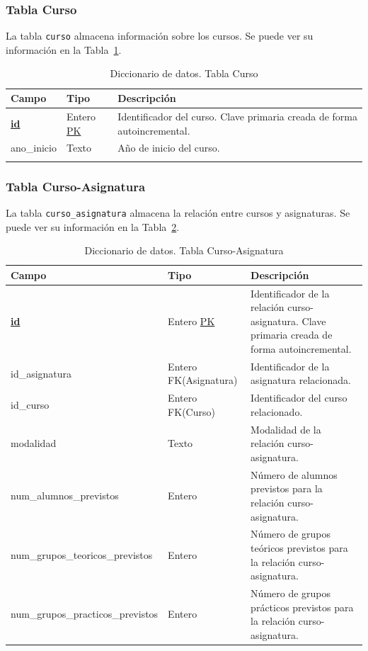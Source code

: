 \subsubsection{Tabla Curso}
La tabla \texttt{curso} almacena información sobre los cursos. Se puede ver su información en la Tabla~\ref{tab:diccionario_curso}.

\begin{table}
  \centering 
  \begin{tabular}{l p{} p{}}
    \toprule
    \textbf{Campo} & \textbf{Tipo} & \textbf{Descripción}\\
    \midrule
    \textbf{\underline{id}} & Entero \underline{PK} & Identificador del curso. Clave primaria creada de forma autoincremental. \\ \addlinespace
    ano\_inicio & Texto & Año de inicio del curso. \\ \addlinespace
    \bottomrule
  \end{tabular}
  \caption{Diccionario de datos. Tabla Curso}
  \label{tab:diccionario_curso}
\end{table}

\subsubsection{Tabla Curso-Asignatura}
La tabla \texttt{curso\_asignatura} almacena la relación entre cursos y asignaturas. 
Se puede ver su información en la Tabla~\ref{tab:diccionario_curso_asignatura}.

\begin{table}
  \centering
  \begin{tabular}{l p{} p{}}
    \toprule
    \textbf{Campo} & \textbf{Tipo} & \textbf{Descripción}\\
    \midrule
    \textbf{\underline{id}} & Entero \underline{PK} & Identificador de la relación curso-asignatura. Clave primaria creada de forma autoincremental. \\ \addlinespace
    id\_asignatura & Entero FK(Asignatura) & Identificador de la asignatura relacionada. \\ \addlinespace
    id\_curso & Entero FK(Curso) & Identificador del curso relacionado. \\ \addlinespace
    modalidad & Texto & Modalidad de la relación curso-asignatura. \\ \addlinespace
    num\_alumnos\_previstos & Entero & Número de alumnos previstos para la relación curso-asignatura. \\ \addlinespace
    num\_grupos\_teoricos\_previstos & Entero & Número de grupos teóricos previstos para la relación curso-asignatura. \\ \addlinespace
    num\_grupos\_practicos\_previstos & Entero & Número de grupos prácticos previstos para la relación curso-asignatura. \\
    \bottomrule
  \end{tabular}
  \caption{Diccionario de datos. Tabla Curso-Asignatura}
  \label{tab:diccionario_curso_asignatura}
\end{table}

